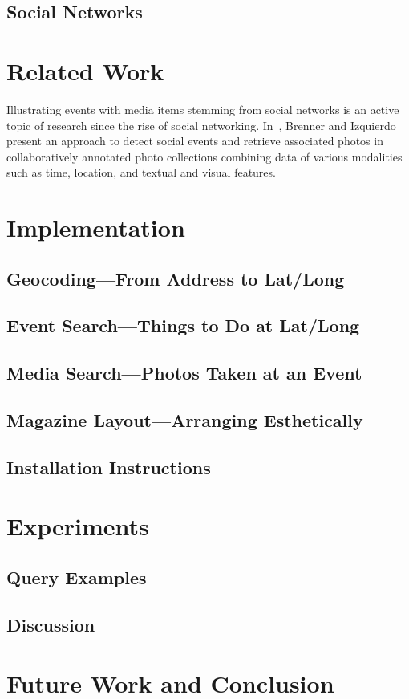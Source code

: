 \documentclass{acm_proc_article-sp}
\begin{document}
\subsection{Social Networks}

\section{Related Work}
Illustrating events with media items stemming from social networks
is an active topic of research since the rise of social networking.
In~\cite{brenner2012}, Brenner and Izquierdo present
an approach to detect social events and retrieve associated photos
in collaboratively annotated photo collections combining data of various modalities
such as time, location, and textual and visual features.

\section{Implementation}

\subsection{Geocoding---From Address to Lat/Long}

\subsection{Event Search---Things to Do at Lat/Long}

\subsection{Media Search---Photos Taken at an Event}

\subsection{Magazine Layout---Arranging Esthetically}

\subsection{Installation Instructions}

\section{Experiments}

\subsection{Query Examples}

\subsection{Discussion}

\section{Future Work and Conclusion}






\balancecolumns
\end{document}
